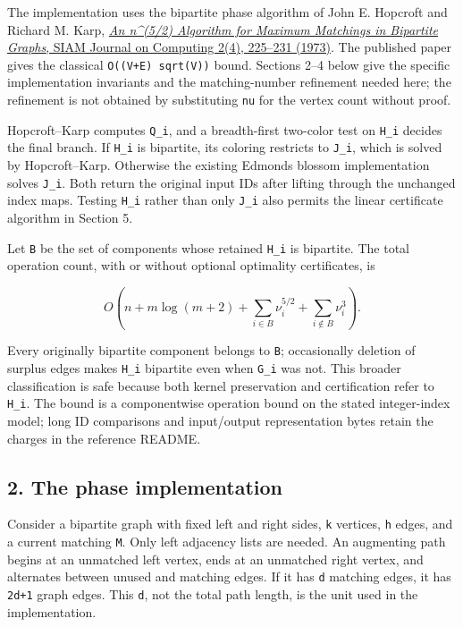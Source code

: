 The implementation uses the bipartite phase algorithm of John E. Hopcroft and Richard M. Karp, \href{https://doi.org/10.1137/0202019}{\emph{An n\^{}(5/2) Algorithm for Maximum Matchings in Bipartite Graphs}, SIAM Journal on Computing 2(4), 225--231 (1973)}. The published paper gives the classical \texttt{O((V+E)\ sqrt(V))} bound. Sections 2--4 below give the specific implementation invariants and the matching-number refinement needed here; the refinement is not obtained by substituting \texttt{nu} for the vertex count without proof.

Hopcroft--Karp computes \texttt{Q\_i}, and a breadth-first two-color test on \texttt{H\_i} decides the final branch. If \texttt{H\_i} is bipartite, its coloring restricts to \texttt{J\_i}, which is solved by Hopcroft--Karp. Otherwise the existing Edmonds blossom implementation solves \texttt{J\_i}. Both return the original input IDs after lifting through the unchanged index maps. Testing \texttt{H\_i} rather than only \texttt{J\_i} also permits the linear certificate algorithm in Section 5.

Let \texttt{B} be the set of components whose retained \texttt{H\_i} is bipartite. The total operation count, with or without optional optimality certificates, is

\[
O\!\left(n+m\log(m+2)
  +\sum_{i\in B}\nu_i^{5/2}
  +\sum_{i\notin B}\nu_i^3\right).
\]

Every originally bipartite component belongs to \texttt{B}; occasionally deletion of surplus edges makes \texttt{H\_i} bipartite even when \texttt{G\_i} was not. This broader classification is safe because both kernel preservation and certification refer to \texttt{H\_i}. The bound is a componentwise operation bound on the stated integer-index model; long ID comparisons and input/output representation bytes retain the charges in the reference README.

\hypertarget{af-4c656876fd-the-phase-implementation}{%
\subsection{2. The phase implementation}\label{af-4c656876fd-the-phase-implementation}}

Consider a bipartite graph with fixed left and right sides, \texttt{k} vertices, \texttt{h} edges, and a current matching \texttt{M}. Only left adjacency lists are needed. An augmenting path begins at an unmatched left vertex, ends at an unmatched right vertex, and alternates between unused and matching edges. If it has \texttt{d} matching edges, it has \texttt{2d+1} graph edges. This \texttt{d}, not the total path length, is the unit used in the implementation.

